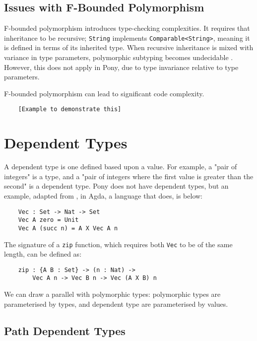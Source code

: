 \subsection{Issues with F-Bounded Polymorphism}

F-bounded polymorphism introduces type-checking complexities. It requires that inheritance to be recursive; \texttt{String} implements \texttt{Comparable<String>}, meaning it is defined in terms of its inherited type. When recursive inheritance is mixed with variance in type parameters, polymorphic subtyping becomes undecidable \cite{Kennedy2008}. However, this does not apply in Pony, due to type invariance relative to type parameters. 

F-bounded polymorphism can lead to significant code complexity.
\begin{verbatim}
    [Example to demonstrate this]
\end{verbatim}


\section{Dependent Types}

A dependent type is one defined based upon a value. For example, a "pair of integers" is a type, and a "pair of integers where the first value is greater than the second" is a dependent type. Pony does not have dependent types, but an example, adapted from \cite{Bove2009}, in Agda, a language that does, is below: 
\begin{verbatim}
    Vec : Set -> Nat -> Set
    Vec A zero = Unit
    Vec A (succ n) = A X Vec A n
\end{verbatim}
The signature of a \texttt{zip} function, which requires both \texttt{Vec} to be of the same length, can be defined as:
\begin{verbatim}
    zip : {A B : Set} -> (n : Nat) ->
        Vec A n -> Vec B n -> Vec (A X B) n
\end{verbatim}

We can draw a parallel with polymorphic types: polymorphic types are parameterised by types, and dependent type are parameterised by values.

\subsection{Path Dependent Types}

